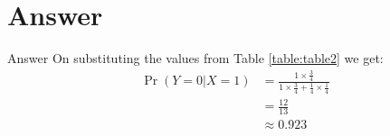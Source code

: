 \documentclass{beamer}
\providecommand{\pr}[1]{\ensuremath{\Pr\left(#1\right)}}
\begin{document}
	\section{Answer}
	\begin{frame}{Answer}
	On substituting the values from Table \eqref{table:table2} we get:
	\begin{align}
		\pr{Y = 0|X = 1} &= \frac{1 \times \frac34}{1 \times \frac34 + \frac14 \times \frac14} \\
		&= \frac{12}{13} \\
		&\approx 0.923
	\end{align}
	\end{frame}
	
\end{document}
